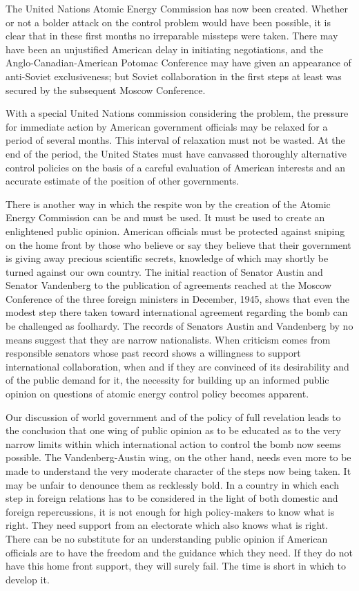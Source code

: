 The United Nations Atomic Energy Commission has now been created. Whether or not a bolder attack on the control problem would have been possible, it is clear that in these first months no irreparable missteps were taken. There may have been an unjustified American delay in initiating negotiations, and the Anglo-Canadian-American Potomac Conference may have given an appearance of anti-Soviet exclusiveness; but Soviet collaboration in the first steps at least was secured by the subsequent Moscow Conference.

With a special United Nations commission considering the problem, the pressure for immediate action by American government officials may be relaxed for a period of several months. This interval of relaxation must not be wasted. At the end of the period, the United States must have canvassed thoroughly alternative control policies on the basis of a careful evaluation of American interests and an accurate estimate of the position of other governments.

There is another way in which the respite won by the creation of the Atomic Energy Commission can be and must be used. It must be used to create an enlightened public opinion. American officials must be protected against sniping on the home front by those who believe or say they believe that their government is giving away precious scientific secrets, knowledge of which may shortly be turned against our own country. The initial reaction of Senator Austin and Senator Vandenberg to the publication of agreements reached at the Moscow Conference of the three foreign ministers in December, 1945, shows that even the modest step there taken toward international agreement regarding the bomb can be challenged as foolhardy. The records of Senators Austin and Vandenberg by no means suggest that they are narrow nationalists. When criticism comes from responsible senators whose past record shows a willingness to support international collaboration, when and if they are convinced of its desirability and of the public demand for it, the necessity for building up an informed public opinion on questions of atomic energy control policy becomes apparent.

Our discussion of world government and of the policy of full revelation leads to the conclusion that one wing of public opinion as to be educated as to the very narrow limits within which international action to control the bomb now seems possible. The Vandenberg-Austin wing, on the other hand, needs even more to be made to understand the very moderate character of the steps now being taken. It may be unfair to denounce them as recklessly bold. In a country in which each step in foreign relations has to be considered in the light of both domestic and foreign repercussions, it is not enough for high policy-makers to know what is right. They need support from an electorate which also knows what is right. There can be no substitute for an understanding public opinion if American officials are to have the freedom and the guidance which they need. If they do not have this home front support, they will surely fail. The time is short in which to develop it.

